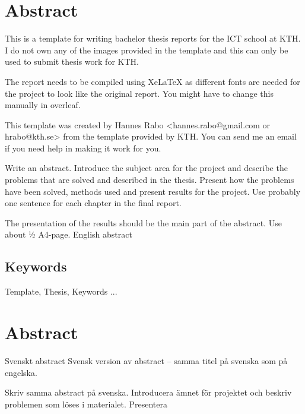 \newpage

\section*{Abstract}

This is a template for writing bachelor thesis reports for the ICT school at KTH. I do not own any of the images provided in the template and this can only be used to submit thesis work for KTH.

The report needs to be compiled using XeLaTeX as different fonts are needed for the project to look like the original report. You might have to change this manually in overleaf.

This template was created by Hannes Rabo <hannes.rabo@gmail.com or hrabo@kth.se> from the template provided by KTH. You can send me an email if you need help in making it work for you.


\vspace{2cm}
Write an abstract. Introduce the subject area for the project and describe the problems that are solved and described in the thesis. Present how the problems have been solved, methods used and present results for the project. Use probably one sentence for each chapter in the final report.

The presentation of the results should be the main part of the abstract. Use about ½ A4-page.
English abstract




\subsection*{Keywords}
Template, Thesis, Keywords ...






\newpage
\section*{Abstract}
Svenskt abstract
Svensk version av abstract – samma titel på svenska som på engelska.

Skriv samma abstract på svenska. Introducera ämnet för projektet och beskriv problemen som löses i materialet. Presentera 

